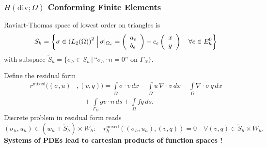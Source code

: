 \begin{frame}
\frametitle{$H(\text{div};\Omega)$ Conforming Finite Elements}
Raviart-Thomas space of lowest order on triangles is
\begin{align*}
S_h = \left\{\sigma\in\left(L_2(\Omega) \right)^2  \,\Bigl|\, \sigma|_{\Omega_e} =
\left(\begin{array}{l} a_e\\ b_e \end{array}\right) + 
c_e \left(\begin{array}{l} x\\ y \end{array}\right) \quad\forall e\in E^0_h
\right\}
\end{align*}
with subspace $\tilde{S}_h = \{\sigma_h\in S_h \,|\, \text{``$\sigma_h\cdot n=0$'' on $\Gamma_N$} \}$.

Define the residual form
\begin{equation*}
\begin{split}
r^\text{mixed}((\sigma,u)&,(v,q)) = 
\int\limits_\Omega \sigma\cdot v \, dx  -\int\limits_\Omega
u \, \nabla\cdot v \, dx 
 - \int\limits_\Omega \nabla\cdot\sigma \, q \, dx\\ 
&\quad + \int\limits_{\Gamma_D} g v\cdot n \, ds + \int\limits_\Omega f q \,
ds .
\end{split}
\end{equation*}
Discrete problem in residual form reads
\begin{equation*}
(\sigma_h, u_h) \in (w_h+\tilde{S}_h)\times W_h : \quad 
r_h^\text{mixed}\left((\sigma_h,u_h),(v,q)\right) = 0 \quad \forall
(v,q) \in \tilde{S}_h\times W_h .
\end{equation*}
\textbf{Systems of PDEs lead to cartesian products of function spaces !}
\end{frame}

